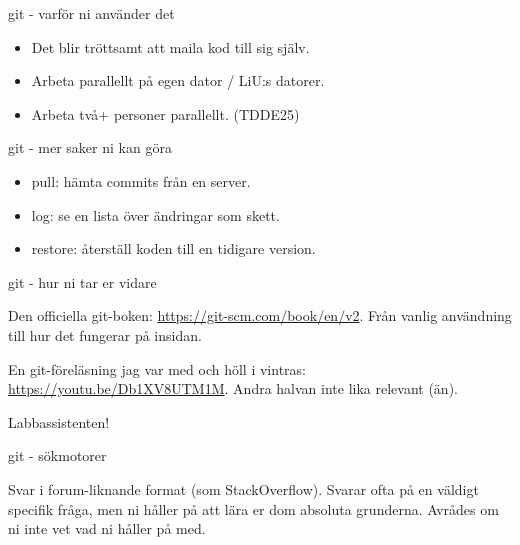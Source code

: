 \documentclass{beamer}
\begin{document}
  \begin{frame}{git - varför ni använder det}

    \pause{}

    \begin{itemize}[<+->]
      \item Det blir tröttsamt att maila kod till sig själv.
      \item Arbeta parallellt på egen dator / LiU:s datorer.
      \item Arbeta två+ personer parallellt. (TDDE25)
    \end{itemize}

  \end{frame}

  \begin{frame}{git - mer saker ni kan göra}

    \begin{itemize}
      \item pull: hämta commits från en server.
      \item log: se en lista över ändringar som skett.
      \item restore: återställ koden till en tidigare version.
    \end{itemize}

  \end{frame}

  \begin{frame}{git - hur ni tar er vidare}

    \pause{}

    Den officiella git-boken: \url{https://git-scm.com/book/en/v2}. Från vanlig
    användning till hur det fungerar på insidan.

    \pause{}

    En git-föreläsning jag var med och höll i vintras:
    \url{https://youtu.be/Db1XV8UTM1M}. Andra halvan inte lika relevant (än).

    \pause{}

    Labbassistenten!

  \end{frame}

  \begin{frame}{git - sökmotorer}

    Svar i forum-liknande format (som StackOverflow). Svarar ofta på en väldigt
    specifik fråga, men ni håller på att lära er dom absoluta grunderna.
    Avrådes om ni inte vet vad ni håller på med.

  \end{frame}
\end{document}
